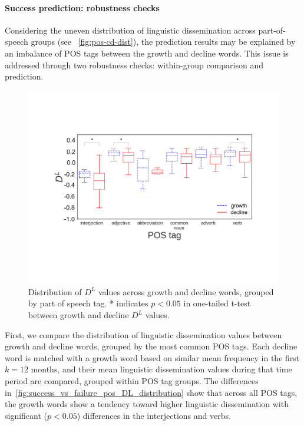 \begin{appendices}
\paragraph{Success prediction: robustness checks}

Considering the uneven distribution of linguistic dissemination across part-of-speech groups (see ~\autoref{fig:pos-cd-dist}), the prediction results may be explained by an imbalance of POS tags between the growth and decline words.
This issue is addressed through two robustness checks: within-group comparison and prediction.

\begin{figure}
\centering
\includegraphics[width=\columnwidth]{figures/growth_vs_decline_matched_pos_DL_distribution_1_12.pdf}
\caption{Distribution of $D^{L}$ values across growth and decline words, grouped by part of speech tag. 
* indicates $p<0.05$ in one-tailed t-test between growth and decline $D^{L}$ values.}
\label{fig:success_vs_failure_pos_DL_distribution}
\end{figure}

First, we compare the distribution of linguistic dissemination values between growth and decline words, grouped by the most common POS tags.
Each decline word is matched with a growth word based on similar mean frequency in the first $k=12$ months, and their mean linguistic dissemination values during that time period are compared, grouped within POS tag groups.
The differences in~\autoref{fig:success_vs_failure_pos_DL_distribution} show that across all POS tags, the growth words show a tendency toward higher linguistic dissemination with significant ($p<0.05$) differences in the interjections and verbs.


\end{appendices}

